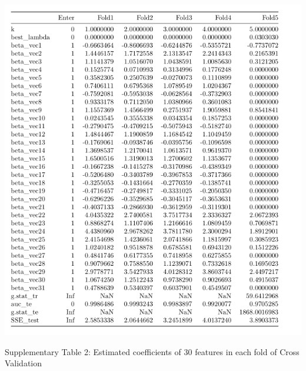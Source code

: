 \documentclass[]{article}
\begin{document}
\begin{center}
\includegraphics{./results/coef of all 30 predictors in logistic lasso.png}
\end{center}

\begin{center}
Supplementary Table 2: Estimated coefficients of 30 features in each fold of Cross Validation
\end{center}
\end{document}
